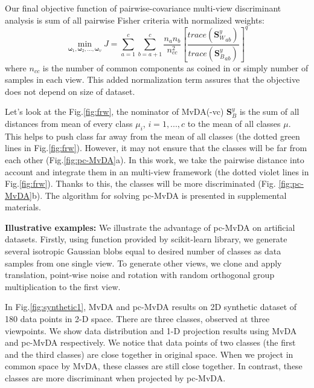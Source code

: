     Our final objective function of pairwise-covariance multi-view discriminant analysis is sum of all pairwise Fisher criteria with normalized weights:
    \begin{equation}
        \operatorname*{min}_{\boldsymbol{\omega}_1, \boldsymbol{\omega}_2,..., \boldsymbol{\omega}_v}{J}=\sum_{a=1}^{c}\sum_{b=a+1}^{c}{\frac{n_an_b}{n_{cc}^2}{\left[{\frac{trace\left({\boldsymbol{S}_W^y}_{ab}\right)}{trace\left({\boldsymbol{S}_B^y}_{ab}\right)}}\right]}^{q}}
        \label{eq:pc-MvDA}
    \end{equation}
    where $n_{cc}$ is the number of common components as coined in \cite{you2019multi} or simply number of samples in each view. This added normalization term assures that the objective does not depend on size of dataset.

    Let's look at the Fig.\ref{fig:frw}, the nominator of MvDA(-vc) $\boldsymbol{S}_B^y$ is the sum of all distances from mean of every class $\mu_i$, $i = {1,...,c}$ to the mean of all classes $\mu$. This helps to push class far away from the mean of all classes (the dotted green lines in Fig.\ref{fig:frw}). However, it may not ensure that the classes will be far from each other (Fig.\ref{fig:pc-MvDA}a). In this work, we take the pairwise distance into account and integrate them in an multi-view framework (the dotted violet lines in Fig.\ref{fig:frw}). Thanks to this, the classes will be more discriminated (Fig. \ref{fig:pc-MvDA}b). The algorithm for solving pc-MvDA is presented in supplemental materials. 

    \textbf{Illustrative examples:} We illustrate the advantage of pc-MvDA on artificial datasets. Firstly, using function provided by scikit-learn library, we generate several isotropic Gaussian blobs equal to desired number of classes as data samples from one single view. To generate other views, we clone and apply translation, point-wise noise and rotation with random orthogonal group multiplication to the first view.

    In Fig.\ref{fig:synthetic1}, MvDA and pc-MvDA results on 2D synthetic dataset of 180 data points in 2-D space. There are three classes, observed at three viewpoints. We show data distribution and 1-D projection results using MvDA and pc-MvDA respectively. We notice that data points of two classes (the first and the third classes) are close together in original space. When we project in common space by MvDA, these classes are still close together. In contrast, these classes are more discriminant when projected by pc-MvDA.

